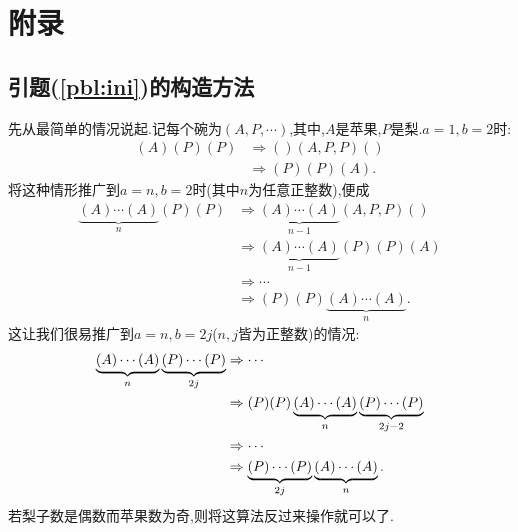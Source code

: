 \section*{附录}
\subsection{引题(\ref{pbl:ini})的构造方法}
先从最简单的情况说起.记每个碗为$(A,P,\cdots)$,其中,$A$是苹果,$P$是梨.$a=1,b=2$时:
	\begin{align*}
	(A)(P)(P) &\Rightarrow ()(A,P,P)()\\
	&\Rightarrow (P)(P)(A).
	\end{align*}
	将这种情形推广到$a=n,b=2$时(其中$n$为任意正整数),便成
	\begin{align*}
	\underbrace{(A)\cdots(A)}_{n}(P)(P) &\Rightarrow \underbrace{(A)\cdots(A)}_{n-1}(A,P,P)()\\
	&\Rightarrow \underbrace{(A)\cdots(A)}_{n-1}(P)(P)(A)\\
	&\Rightarrow \cdots\\
	&\Rightarrow (P)(P)\underbrace{(A)\cdots(A)}_{n}.
	\end{align*}
	这让我们很易推广到$a=n,b=2j$($n,j$皆为正整数)的情况:
	\begin{align*}
	\underbrace{(A)\cdots(A)}_{n}\underbrace{(P)\cdots(P)}_{2j}&\Rightarrow\cdots\\
	&\Rightarrow(P)(P)\underbrace{(A)\cdots(A)}_{n}\underbrace{(P)\cdots(P)}_{2j-2}\\
	&\Rightarrow\cdots\\
	&\Rightarrow\underbrace{(P)\cdots(P)}_{2j}\underbrace{(A)\cdots(A)}_{n}.
	\end{align*}
	若梨子数是偶数而苹果数为奇,则将这算法反过来操作就可以了.